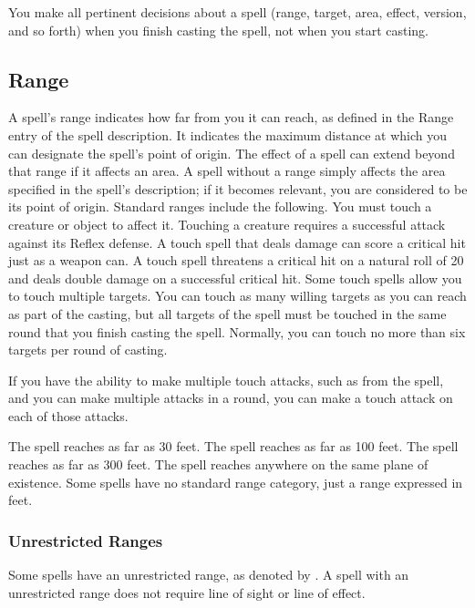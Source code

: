 You make all pertinent decisions about a spell (range, target, area, effect, version, and so forth) when you finish casting the spell, not when you start casting.

\subsection{Range}
A spell's range indicates how far from you it can reach, as defined in the Range entry of the spell description. It indicates the maximum distance at which you can designate the spell's point of origin. The effect of a spell can extend beyond that range if it affects an area. A spell without a range simply affects the area specified in the spell's description; if it becomes relevant, you are considered to be its point of origin. Standard ranges include the following.
 You must touch a creature or object to affect it. Touching a creature requires a successful attack against its Reflex defense. A touch spell that deals damage can score a critical hit just as a weapon can. A touch spell threatens a critical hit on a natural roll of 20 and deals double damage on a successful critical hit. Some touch spells allow you to touch multiple targets. You can touch as many willing targets as you can reach as part of the casting, but all targets of the spell must be touched in the same round that you finish casting the spell. Normally, you can touch no more than six targets per round of casting.

If you have the ability to make multiple touch attacks, such as from the  spell, and you can make multiple attacks in a round, you can make a touch attack on each of those attacks.

 The spell reaches as far as 30 feet.
 The spell reaches as far as 100 feet.
 The spell reaches as far as 300 feet.
 The spell reaches anywhere on the same plane of existence.
 Some spells have no standard range category, just a range expressed in feet.

\subsubsection{Unrestricted Ranges}

Some spells have an unrestricted range, as denoted by \rngunrestricted. A spell with an unrestricted range does not require line of sight or line of effect.

